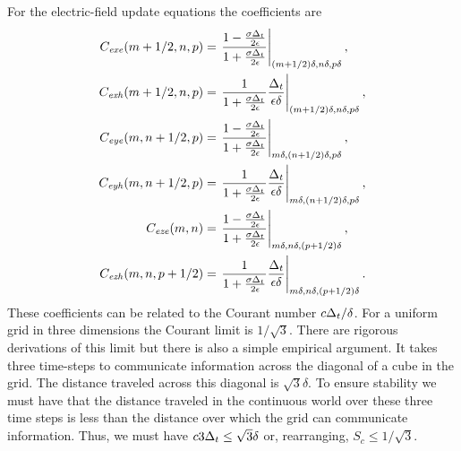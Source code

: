 For the electric-field update equations the coefficients are
\begin{align}
C_{\mathit{exe}}(m+1/2,n,p) &=
  \left.
    \frac{1-\frac{\sigma\Delta_t}{2\epsilon}}{1+\frac{\sigma\Delta_t}{2\epsilon}}
  \right|_{(m+1/2)\delta,n\delta,p\delta}, 
  \label{eq:cexeDef}
\\
C_{\mathit{exh}}(m+1/2,n,p) &=
  \left.
    \frac{1}{1+\frac{\sigma\Delta_t}{2\epsilon}}\frac{\Delta_t}{\epsilon\delta}
  \right|_{(m+1/2)\delta,n\delta,p\delta}, \\
C_{\mathit{eye}}(m,n+1/2,p) &= 
  \left.
  \frac{1-\frac{\sigma\Delta_t}{2\epsilon}}{1+\frac{\sigma\Delta_t}{2\epsilon}}
  \right|_{m\delta,(n+1/2)\delta,p\delta}, 
  \label{eq:ceyeDef}
\\
C_{\mathit{eyh}}(m,n+1/2,p) &= 
  \left.
  \frac{1}{1+\frac{\sigma\Delta_t}{2\epsilon}}
    \frac{\Delta_t}{\epsilon\delta}
  \right|_{m\delta,(n+1/2)\delta,p\delta},\\
C_{\mathit{eze}}(m,n) &=
  \left.
  \frac{1-\frac{\sigma\Delta_t}{2\epsilon}}{1+\frac{\sigma\Delta_t}{2\epsilon}}
  \right|_{m\delta,n\delta,(p+1/2)\delta}, 
  \label{eq:cezeDef}
\\
C_{\mathit{ezh}}(m,n,p+1/2) &=
  \left.
  \frac{1}{1+\frac{\sigma\Delta_t}{2\epsilon}}
    \frac{\Delta_t}{\epsilon\delta}
  \right|_{m\delta,n\delta,(p+1/2)\delta}.
\end{align}
These coefficients can be related to the Courant number
$c\Delta_t/\delta$.  For a uniform grid in three dimensions the Courant
limit is $1/\sqrt{3}$.  There are rigorous derivations of this limit
but there is also a simple empirical argument.  It takes three
time-steps to communicate information across the diagonal of a cube in
the grid.  The distance traveled across this diagonal is
$\sqrt{3}\delta$.  To ensure stability we must have that the distance
traveled in the continuous world over these three time steps is less
than the distance over which the grid can communicate information.
Thus, we must have $c3\Delta_t\leq \sqrt{3}\delta$ or, rearranging,
$S_c\leq 1/\sqrt{3}$.

